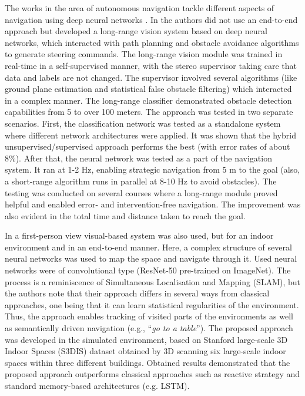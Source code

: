 The works in the area of autonomous navigation tackle different aspects of navigation using deep neural networks \cite{Zhu2017,Chen2015,ShalevShwartz2016,Hadsell2009,Gupta2017}. In \cite{Hadsell2009} the authors did not use an end-to-end approach but developed a long-range vision system based on deep neural networks, which interacted with path planning and obstacle avoidance algorithms to generate steering commands. The long-range vision module was trained in real-time in a self-supervised manner, with the stereo supervisor taking care that data and labels are not changed. The supervisor involved several algorithms (like ground plane estimation and statistical false obstacle filtering) which interacted in a complex manner. The long-range classifier demonstrated obstacle detection capabilities from 5 to over 100 meters. The approach was tested in two separate scenarios. First, the classification network was tested as a standalone system where different network architectures were applied. It was shown that the hybrid unsupervised/supervised approach performs the best (with error rates of about 8\%). After that, the neural network was tested as a part of the navigation system. It ran at 1-2 Hz, enabling strategic navigation from 5 m to the goal (also, a short-range algorithm runs in parallel at 8-10 Hz to avoid obstacles). The testing was conducted on several courses where a long-range module proved helpful and enabled error- and intervention-free navigation. The improvement was also evident in the total time and distance taken to reach the goal.

In \cite{Gupta2017} a first-person view visual-based system was also used, but for an indoor environment and in an end-to-end manner. Here, a complex structure of several neural networks was used to map the space and navigate through it. Used neural networks were of convolutional type (ResNet-50 pre-trained on ImageNet). The process is a reminiscence of Simultaneous Localisation and Mapping (SLAM), but the authors note that their approach differs in several ways from classical approaches, one being that it can learn statistical regularities of the environment. Thus, the approach enables tracking of visited parts of the environments as well as semantically driven navigation (e.g., ``\emph{go to a table}''). The proposed approach was developed in the simulated environment, based on Stanford large-scale 3D Indoor Spaces (S3DIS) dataset obtained by 3D scanning six large-scale indoor spaces within three different buildings. Obtained results demonstrated that the proposed approach outperforms classical approaches such as reactive strategy and standard memory-based architectures (e.g. LSTM).

